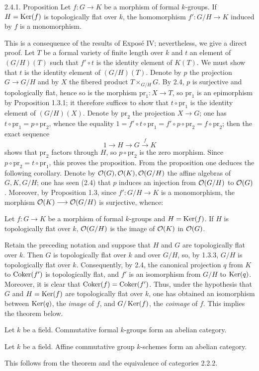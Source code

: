 \begin{enonce}{2.4.1. Proposition}{}\label{VIIB.2.4.1}
Let $f:G\to K$ be a morphism of formal $k$-groups. If $H=\operatorname{Ker}(f)$ is topologically flat over $k$, the homomorphism $f':G/H\to K$ induced by $f$ is a monomorphism.
\end{enonce}
This is a consequence of the results of Exposé IV; nevertheless, we give a direct proof. Let $T$ be a formal variety of finite length over $k$ and $t$ an element of $(G/H)(T)$ such that $f'\circ t$ is the identity element of $K(T)$. We must show that $t$ is the identity element of $(G/H)(T)$. Denote by $p$ the projection $G\to G/H$ and by $X$ the fibered product $T\times_{G/H}G$.
By 2.4, $p$ is surjective and topologically flat, hence so is the morphism $\mathrm{pr}_1:X\to T$, so $\mathrm{pr}_1$ is an epimorphism by Proposition 1.3.1; it therefore suffices to show that $t\circ\mathrm{pr}_1$ is the identity element of $(G/H)(X)$. Denote by $\mathrm{pr}_2$ the projection $X\to G$; one has $t\circ\mathrm{pr}_1=p\circ\mathrm{pr}_2$, whence the equality $1=f'\circ t\circ\mathrm{pr}_1=f'\circ p\circ\mathrm{pr}_2=f\circ\mathrm{pr}_2$; then the exact sequence
\[
1\to H\to G\xrightarrow f K
\]
shows that $\mathrm{pr}_2$ factors through $H$, so $p\circ\mathrm{pr}_2$ is the zero morphism. Since $p\circ\mathrm{pr}_2=t\circ\mathrm{pr}_1$, this proves the proposition.
From the proposition one deduces the following corollary. Denote by $\mathcal{O}(G),\mathcal{O}(K),\mathcal{O}(G/H)$ the affine algebras of $G,K,G/H$; one has seen (2.4) that $p$ induces an injection from $\mathcal{O}(G/H)$ to $\mathcal{O}(G)$. Moreover, by Proposition 1.3, since $f':G/H\to K$ is a monomorphism, the morphism $\mathcal{O}(K)\longrightarrow\mathcal{O}(G/H)$ is surjective, whence:
\begin{corollary}{}
Let $f:G\to K$ be a morphism of formal $k$-groups and $H=\operatorname{Ker}(f)$. If $H$ is topologically flat over $k$, $\mathcal{O}(G/H)$ is the image of $\mathcal{O}(K)$ in $\mathcal{O}(G)$.
\end{corollary}

Retain the preceding notation and suppose that $H$ and $G$ are topologically flat over $k$. Then $G$ is topologically flat over $k$ and over $G/H$, so, by 1.3.3, $G/H$ is topologically flat over $k$. Consequently, by 2.4, the canonical projection $q$ from $K$ to $\operatorname{Coker}(f')$ is topologically flat, and $f'$ is an isomorphism from $G/H$ to $\operatorname{Ker}(q)$. Moreover, it is clear that $\operatorname{Coker}(f)=\operatorname{Coker}(f')$. Thus, under the hypothesis that $G$ and $H=\operatorname{Ker}(f)$ are topologically flat over $k$, one has obtained an isomorphism between $\operatorname{Ker}(q)$, the \emph{image} of $f$, and $G/\operatorname{Ker}(f)$, the \emph{coimage} of $f$. This implies the theorem below.
\begin{theorem}{}
Let $k$ be a field. Commutative formal $k$-groups form an abelian category.
\end{theorem}
\begin{corollary}{}
Let $k$ be a field. Affine commutative group $k$-schemes form an abelian category.
\end{corollary}
This follows from the theorem and the equivalence of categories 2.2.2.

